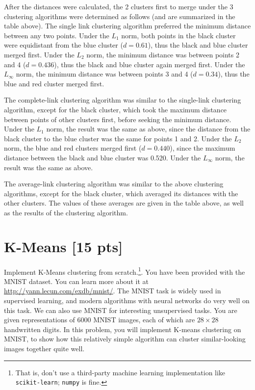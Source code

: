 \documentclass[submit]{harvardml}
\begin{document}
After the distances were calculated, the 2 clusters first to merge under the 3 clustering algorithms were determined as follows (and are summarized in the table above). The single link clustering algorithm preferred the minimum distance between any two points. Under the $L_1$ norm, both points in the black cluster were equidistant from the blue cluster ($d = 0.61$), thus the black and blue cluster merged first. Under the $L_2$ norm, the minimum distance was between points 2 and 4 ($d = 0.436$), thus the black and blue cluster again merged first. Under the $L_\infty$ norm, the minimum distance was between points 3 and 4 ($d = 0.34$), thus the blue and red cluster merged first. 

The complete-link clustering algorithm was similar to the single-link clustering algorithm, except for the black cluster, which took the maximum distance between points of other clusters first, before seeking the minimum distance. Under the $L_1$ norm, the result was the same as above, since the distance from the black cluster to the blue cluster was the same for points 1 and 2. Under the $L_2$ norm, the blue and red clusters merged first ($d=0.440$), since the maximum distance between the black and blue cluster was 0.520. Under the $L_\infty$ norm, the result was the same as above. 

The average-link clustering algorithm was similar to the above clustering algorithms, except for the black cluster, which averaged its distances with the other clusters. The values of these averages are given in the table above, as well as the results of the clustering algorithm. 

\newpage

\section*{K-Means [15 pts]}
Implement K-Means clustering from scratch.\footnote{That is, don't use a
third-party machine learning implementation like \texttt{scikit-learn};
\texttt{numpy} is fine.}. You have been provided with the MNIST dataset. You can
learn more about it at  \url{http://yann.lecun.com/exdb/mnist/}. The MNIST task
is widely used in supervised learning, and modern algorithms with neural
networks do very well on this task. We can also use MNIST for interesting
unsupervised tasks. You are given representations of 6000 MNIST images, each of
which are $28\times28$  handwritten digits. In this problem, you will implement
K-means clustering on MNIST, to show how this relatively simple algorithm can
cluster similar-looking images together quite well.
\end{document}
